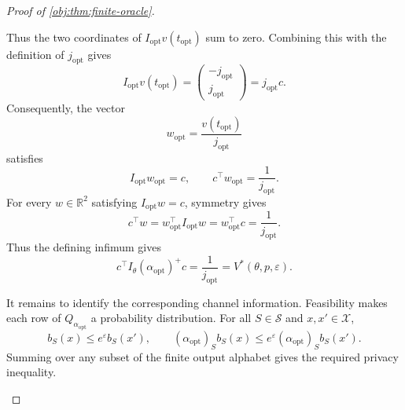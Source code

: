 \begin{proof}[Proof of \cref{obj:thm:finite-oracle}]
\begin{enumerate}
Thus the two coordinates of
\(I_{\mathrm{opt}}v(t_{\mathrm{opt}})\) sum to zero. Combining this
with the definition of \(j_{\mathrm{opt}}\) gives
\[
I_{\mathrm{opt}}v(t_{\mathrm{opt}})
=
\begin{pmatrix}-j_{\mathrm{opt}}\\j_{\mathrm{opt}}\end{pmatrix}
=j_{\mathrm{opt}}c.
\]
Consequently, the vector
\[
w_{\mathrm{opt}}
=\frac{v(t_{\mathrm{opt}})}{j_{\mathrm{opt}}}
\]
satisfies
\[
I_{\mathrm{opt}}w_{\mathrm{opt}}=c,
\qquad
c^\top w_{\mathrm{opt}}=\frac1{j_{\mathrm{opt}}}.
\]
For every \(w\in\mathbb R^2\) satisfying \(I_{\mathrm{opt}}w=c\),
symmetry gives
\[
c^\top w
=w_{\mathrm{opt}}^\top I_{\mathrm{opt}}w
=w_{\mathrm{opt}}^\top c
=\frac1{j_{\mathrm{opt}}}.
\]
Thus the defining infimum gives
\[
c^\top I_\theta(\alpha_{\mathrm{opt}})^+c
=
\frac1{j_{\mathrm{opt}}}
=
V^*(\theta,p,\varepsilon).
\]

It remains to identify the corresponding channel information.
Feasibility makes each row of \(Q_{\alpha_{\mathrm{opt}}}\) a
probability distribution. For all \(S\in\mathcal S\) and
\(x,x'\in\mathcal X\),
\[
b_S(x)\le e^\varepsilon b_S(x'),
\qquad
(\alpha_{\mathrm{opt}})_Sb_S(x)
\le
e^\varepsilon(\alpha_{\mathrm{opt}})_Sb_S(x').
\]
Summing over any subset of the finite output alphabet gives the
required privacy inequality.


\end{enumerate}
\end{proof}
